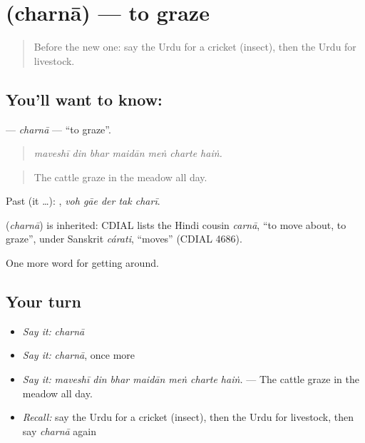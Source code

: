 \section[\texorpdfstring{\ur{چرنا} (charnā)}{چرنا (charnā)}]{ (charnā) — to graze}

\label{lesson:UR-C439-charna}



\begin{quote}
Before the new one: say the Urdu for a cricket (insect), then the Urdu for livestock.
\end{quote}

\subsection*{You'll want to know: }
\textbf{} — \emph{charnā} — \textquotedblleft{}to graze\textquotedblright{}.

\begin{quote}
      
\end{quote}

\begin{quote}
\emph{maveshī din bhar maidān meṅ charte haiṅ.}
\end{quote}

\begin{quote}
The cattle graze in the meadow all day.
\end{quote}

Past (it …):     , \emph{voh gāe der tak charī}.

\begin{cousinweb}
\textbf{} (\emph{charnā}) is inherited: CDIAL lists the Hindi cousin \emph{carnā}, \textquotedblleft{}to move about, to graze\textquotedblright{}, under Sanskrit \emph{cárati}, \textquotedblleft{}moves\textquotedblright{} (CDIAL 4686).
\end{cousinweb}

\begin{grammarlens}[title={What you've built}]
One more word for getting around.
\end{grammarlens}

\subsection*{Your turn}
\begin{itemize}
\raggedright
  \item \emph{Say it:} \emph{charnā}
  \item \emph{Say it:} \emph{charnā}, once more
  \item \emph{Say it:} \emph{maveshī din bhar maidān meṅ charte haiṅ.} — The cattle graze in the meadow all day.
  \item \emph{Recall:} say the Urdu for a cricket (insect), then the Urdu for livestock, then say \emph{charnā} again
\end{itemize}


